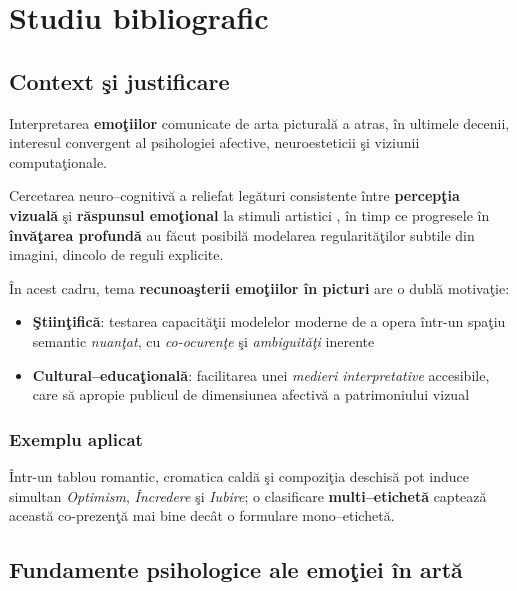 \chapter{Studiu bibliografic}
\label{ch:studiubib}


\section{Context şi justificare}

Interpretarea \textbf{emoţiilor} comunicate de arta picturală a atras, în ultimele decenii, interesul convergent al psihologiei afective, neuroesteticii şi viziunii computaţionale. 

Cercetarea neuro–cognitivă a reliefat legături consistente între \textbf{percepţia vizuală} şi \textbf{răspunsul emoţional} la stimuli artistici \cite{zeki2001neural}, în timp ce progresele în \textbf{învăţarea profundă} au făcut posibilă modelarea regularităţilor subtile din imagini, dincolo de reguli explicite. 

În acest cadru, tema \textbf{recunoaşterii emoţiilor în picturi} are o dublă motivaţie:
\begin{itemize}
  \item \textbf{Ştiinţifică}: testarea capacităţii modelelor moderne de a opera într-un spaţiu semantic \emph{nuanţat}, cu \emph{co-ocurenţe} şi \emph{ambiguităţi} inerente
  \item \textbf{Cultural–educaţională}: facilitarea unei \emph{medieri interpretative} accesibile, care să apropie publicul de dimensiunea afectivă a patrimoniului vizual
\end{itemize}

\subsection*{Exemplu aplicat}
Într-un tablou romantic, cromatica caldă şi compoziţia deschisă pot induce simultan \emph{Optimism}, \emph{Încredere} şi \emph{Iubire}; o clasificare \textbf{multi–etichetă} captează această co-prezenţă mai bine decât o formulare mono–etichetă.

\section{Fundamente psihologice ale emoţiei în artă}

